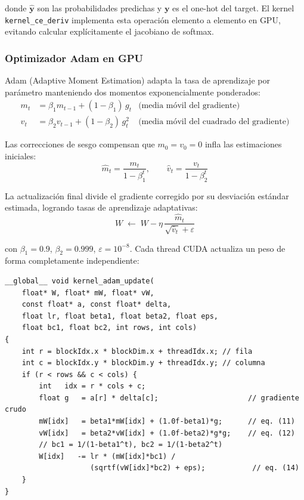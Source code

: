 \documentclass[12pt,a4paper]{article}
\begin{document}
donde $\hat{\mathbf{y}}$ son las probabilidades predichas y $\mathbf{y}$ es el
one-hot del target. El kernel \texttt{kernel\_ce\_deriv} implementa esta operación
elemento a elemento en GPU, evitando calcular explícitamente el jacobiano de softmax.

\subsubsection{Optimizador Adam en GPU}

Adam (Adaptive Moment Estimation) adapta la tasa de aprendizaje por parámetro
manteniendo dos momentos exponencialmente ponderados:
\begin{align}
  m_t &= \beta_1 m_{t-1} + (1-\beta_1)\, g_t
        & \text{(media móvil del gradiente)}
  \label{eq:adam_m}\\
  v_t &= \beta_2 v_{t-1} + (1-\beta_2)\, g_t^2
        & \text{(media móvil del cuadrado del gradiente)}
  \label{eq:adam_v}
\end{align}

Las correcciones de sesgo compensan que $m_0 = v_0 = 0$ infla las estimaciones
iniciales:
\begin{equation}
  \hat{m}_t = \frac{m_t}{1-\beta_1^t}, \qquad
  \hat{v}_t = \frac{v_t}{1-\beta_2^t}
  \label{eq:adam_bc}
\end{equation}

La actualización final divide el gradiente corregido por su desviación estándar
estimada, logrando tasas de aprendizaje adaptativas:
\begin{equation}
  W \;\leftarrow\; W - \eta\,\frac{\hat{m}_t}{\sqrt{\hat{v}_t} + \varepsilon}
  \label{eq:adam_update}
\end{equation}

con $\beta_1 = 0.9$, $\beta_2 = 0.999$, $\varepsilon = 10^{-8}$.
Cada thread CUDA actualiza un peso de forma completamente independiente:

\begin{lstlisting}[caption={Kernel Adam: un thread actualiza un peso independiente}]
__global__ void kernel_adam_update(
    float* W, float* mW, float* vW,
    const float* a, const float* delta,
    float lr, float beta1, float beta2, float eps,
    float bc1, float bc2, int rows, int cols)
{
    int r = blockIdx.x * blockDim.x + threadIdx.x; // fila
    int c = blockIdx.y * blockDim.y + threadIdx.y; // columna
    if (r < rows && c < cols) {
        int   idx = r * cols + c;
        float g   = a[r] * delta[c];                     // gradiente crudo
        mW[idx]   = beta1*mW[idx] + (1.0f-beta1)*g;      // eq. (11)
        vW[idx]   = beta2*vW[idx] + (1.0f-beta2)*g*g;    // eq. (12)
        // bc1 = 1/(1-beta1^t), bc2 = 1/(1-beta2^t)
        W[idx]   -= lr * (mW[idx]*bc1) /
                    (sqrtf(vW[idx]*bc2) + eps);           // eq. (14)
    }
}
\end{lstlisting}
\end{document}
